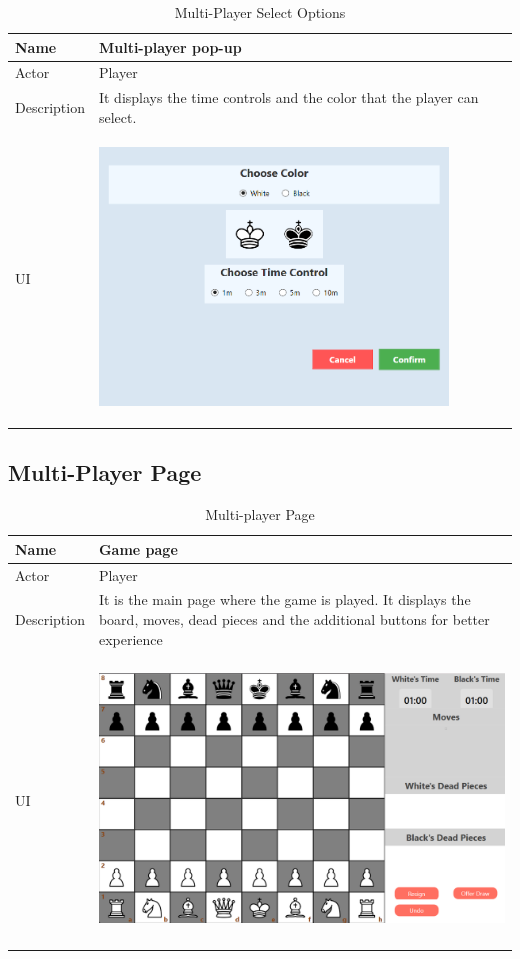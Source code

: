 \documentclass[a4paper,12pt]{article}
\begin{document}
\begin{longtable}{|m{}|m{}|}
    \caption{Multi-Player Select Options} \\
    \hline
    Name & Multi-player pop-up \\
    \hline
    Actor & Player \\
    \hline
    Description & It displays the time controls and the color that the player can select. \\ 
    \hline
    \centering UI & 
    \begin{center}
        \includegraphics[height=2.7in]{Images/Use Cases/multiplayerSelectOptions.png}
    \end{center} \\ 
    \hline
\end{longtable}

\subsection{Multi-Player Page}

\begin{longtable}{|m{}|m{}|}
    \caption{Multi-player Page} \\
    \hline
    Name & Game page \\
    \hline
    Actor & Player \\
    \hline
    Description & It is the main page where the game is played. It displays the board, moves, dead pieces and the additional buttons for better experience \\ 
    \hline
    \centering UI & 
    \begin{center}
        \includegraphics[height=2.7in]{Images/Use Cases/multiplayerPage.png}
    \end{center} \\ 
    \hline
\end{longtable}
\end{document}
